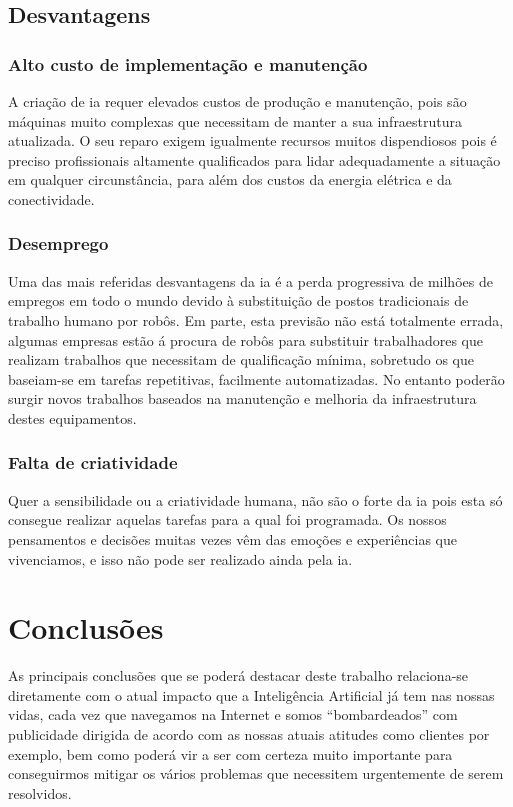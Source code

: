\documentclass{report}
\begin{document}
\section{Desvantagens}
\subsection{Alto custo de implementação e manutenção}
A criação de \ac{ia} requer elevados custos de produção e manutenção, pois são máquinas muito complexas que necessitam de manter a sua infraestrutura atualizada. O seu reparo exigem igualmente recursos muitos dispendiosos pois é preciso profissionais altamente qualificados para lidar adequadamente a situação em qualquer circunstância, para além dos custos da energia elétrica e da conectividade. 

\subsection{Desemprego}
Uma das mais referidas desvantagens da \ac{ia} é a perda progressiva de milhões de empregos em todo o mundo devido à substituição de postos tradicionais de trabalho humano por robôs. Em parte, esta previsão não está totalmente errada, algumas empresas estão á procura de robôs para substituir trabalhadores que realizam trabalhos que necessitam de qualificação mínima, sobretudo os que baseiam-se em tarefas repetitivas, facilmente automatizadas. No entanto poderão surgir novos trabalhos baseados na manutenção e melhoria da infraestrutura destes equipamentos.

\subsection{Falta de criatividade}
Quer a sensibilidade ou a criatividade humana, não são o forte da \ac{ia} pois esta só consegue realizar aquelas tarefas para a qual foi programada. Os nossos pensamentos e decisões muitas vezes vêm das emoções e experiências que vivenciamos, e isso não pode ser realizado ainda pela \ac{ia}.




\chapter{Conclusões}
\label{chap.conclusao}
As principais conclusões que se poderá destacar deste trabalho relaciona-se diretamente com o atual impacto que a Inteligência Artificial já tem nas nossas vidas, cada vez que navegamos na Internet e somos ``bombardeados'' com publicidade dirigida de acordo com as nossas atuais atitudes como clientes por exemplo, bem como poderá vir a ser com certeza muito importante para conseguirmos mitigar os vários problemas que necessitem urgentemente de serem  resolvidos.
\end{document}
